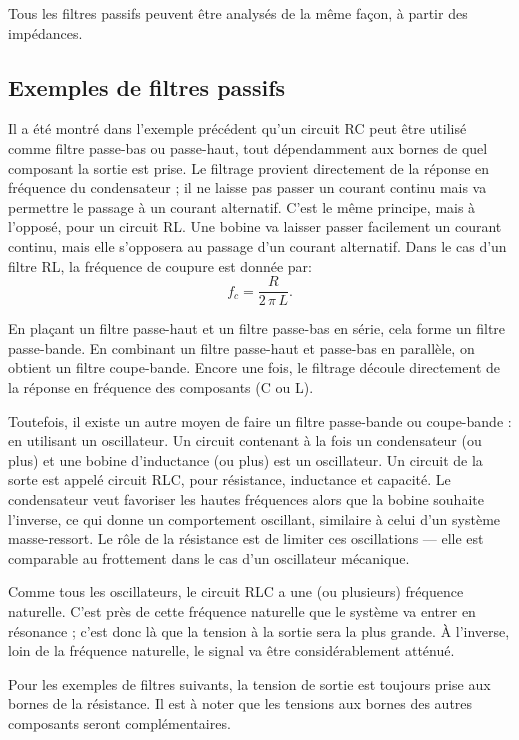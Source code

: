 \documentclass[canadien,12pt,oneside,letterpaper]{article}
\begin{document}
Tous les filtres passifs peuvent être analysés de la même façon, à partir des impédances.


\subsection{Exemples de filtres passifs}

Il a été montré dans l'exemple précédent qu'un circuit RC peut être utilisé comme filtre passe-bas ou passe-haut, tout dépendamment aux bornes de quel composant la sortie est prise. Le filtrage provient directement de la réponse en fréquence du condensateur ; il ne laisse pas passer un courant continu mais va permettre le passage à un courant alternatif. C'est le même principe, mais à l'opposé, pour un circuit RL. Une bobine va laisser passer facilement un courant continu, mais elle s'opposera au passage d'un courant alternatif. Dans le cas d'un filtre RL, la fréquence de coupure est donnée par:
\begin{equation}
f_c=\frac{R}{2\,\pi\,L}.
\end{equation}

En plaçant un filtre passe-haut et un filtre passe-bas en série, cela forme un filtre passe-bande. En combinant un filtre passe-haut et passe-bas en parallèle, on obtient un filtre coupe-bande. Encore une fois, le filtrage découle directement de la réponse en fréquence des composants (C ou L).

Toutefois, il existe un autre moyen de faire un filtre passe-bande ou coupe-bande : en utilisant un oscillateur. Un circuit contenant à la fois un condensateur (ou plus) et une bobine d'inductance (ou plus) est un oscillateur. Un circuit de la sorte est appelé circuit RLC, pour résistance, inductance et capacité. Le condensateur veut favoriser les hautes fréquences alors que la bobine souhaite l'inverse, ce qui donne un comportement oscillant, similaire à celui d'un système masse-ressort. Le rôle de la résistance est de limiter ces oscillations --- elle est comparable au frottement dans le cas d'un oscillateur mécanique.

Comme tous les oscillateurs, le circuit RLC a une (ou plusieurs) fréquence naturelle. C'est près de cette fréquence naturelle que le système va entrer en résonance ; c'est donc là que la tension à la sortie sera la plus grande. À l'inverse, loin de la fréquence naturelle, le signal va être considérablement atténué.

Pour les exemples de filtres suivants, la tension de sortie est toujours prise aux bornes de la résistance. Il est à noter que les tensions aux bornes des autres composants seront complémentaires.
\end{document}
